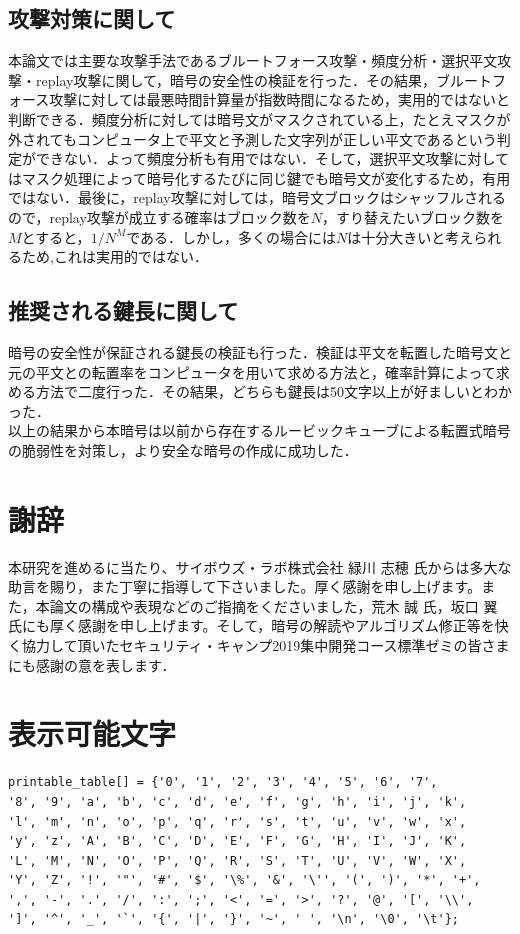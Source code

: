\documentclass[a4j,titlepage]{jsarticle}
\begin{document}
\subsection{攻撃対策に関して}
本論文では主要な攻撃手法であるブルートフォース攻撃・頻度分析・選択平文攻撃・replay攻撃に関して，暗号の安全性の検証を行った．その結果，ブルートフォース攻撃に対しては最悪時間計算量が指数時間になるため，実用的ではないと判断できる．頻度分析に対しては暗号文がマスクされている上，たとえマスクが外されてもコンピュータ上で平文と予測した文字列が正しい平文であるという判定ができない．よって頻度分析も有用ではない．そして，選択平文攻撃に対してはマスク処理によって暗号化するたびに同じ鍵でも暗号文が変化するため，有用ではない．最後に，replay攻撃に対しては，暗号文ブロックはシャッフルされるので，replay攻撃が成立する確率はブロック数を\(N\)，すり替えたいブロック数を\(M\)とすると，\(1/N^M\)である．しかし，多くの場合には\(N\)は十分大きいと考えられるため,これは実用的ではない．

\subsection{推奨される鍵長に関して}
暗号の安全性が保証される鍵長の検証も行った．検証は平文を転置した暗号文と元の平文との転置率をコンピュータを用いて求める方法と，確率計算によって求める方法で二度行った．その結果，どちらも鍵長は50文字以上が好ましいとわかった．\\

以上の結果から本暗号は以前から存在するルービックキューブによる転置式暗号の脆弱性を対策し，より安全な暗号の作成に成功した．

\section{謝辞}
本研究を進めるに当たり、サイボウズ・ラボ株式会社 緑川 志穂 氏からは多大な助言を賜り，また丁寧に指導して下さいました。厚く感謝を申し上げます。また，本論文の構成や表現などのご指摘をくださいました，荒木 誠 氏，坂口 翼 氏にも厚く感謝を申し上げます。そして，暗号の解読やアルゴリズム修正等を快く協力して頂いたセキュリティ・キャンプ2019集中開発コース標準ゼミの皆さまにも感謝の意を表します．

\appendix
\section{表示可能文字}
\begin{verbatim}
printable_table[] = {'0', '1', '2', '3', '4', '5', '6', '7', 
'8', '9', 'a', 'b', 'c', 'd', 'e', 'f', 'g', 'h', 'i', 'j', 'k', 
'l', 'm', 'n', 'o', 'p', 'q', 'r', 's', 't', 'u', 'v', 'w', 'x', 
'y', 'z', 'A', 'B', 'C', 'D', 'E', 'F', 'G', 'H', 'I', 'J', 'K', 
'L', 'M', 'N', 'O', 'P', 'Q', 'R', 'S', 'T', 'U', 'V', 'W', 'X', 
'Y', 'Z', '!', '"', '#', '$', '\%', '&', '\'', '(', ')', '*', '+', 
',', '-', '.', '/', ':', ';', '<', '=', '>', '?', '@', '[', '\\', 
']', '^', '_', '`', '{', '|', '}', '~', ' ', '\n', '\0', '\t'};
\end{verbatim}
\end{document}
